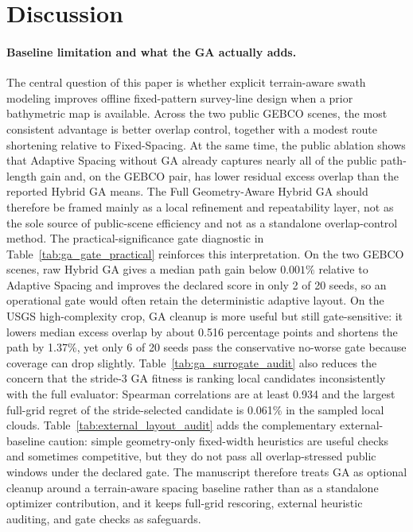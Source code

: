 \documentclass[jmse,article,submit,moreauthors]{Definitions/mdpi}
\begin{document}
\section{Discussion}
\label{sec:discussion}
\paragraph{Baseline limitation and what the GA actually adds.}
The central question of this paper is whether explicit terrain-aware swath modeling improves offline fixed-pattern survey-line design when a prior bathymetric map is available. Across the two public GEBCO scenes, the most consistent advantage is better overlap control, together with a modest route shortening relative to Fixed-Spacing. At the same time, the public ablation shows that Adaptive Spacing without GA already captures nearly all of the public path-length gain and, on the GEBCO pair, has lower residual excess overlap than the reported Hybrid GA means. The Full Geometry-Aware Hybrid GA should therefore be framed mainly as a local refinement and repeatability layer, not as the sole source of public-scene efficiency and not as a standalone overlap-control method.
The practical-significance gate diagnostic in Table~\ref{tab:ga_gate_practical} reinforces this interpretation. On the two GEBCO scenes, raw Hybrid GA gives a median path gain below \(0.001\%\) relative to Adaptive Spacing and improves the declared score in only 2 of 20 seeds, so an operational gate would often retain the deterministic adaptive layout. On the USGS high-complexity crop, GA cleanup is more useful but still gate-sensitive: it lowers median excess overlap by about 0.516 percentage points and shortens the path by 1.37\%, yet only 6 of 20 seeds pass the conservative no-worse gate because coverage can drop slightly. Table~\ref{tab:ga_surrogate_audit} also reduces the concern that the stride-3 GA fitness is ranking local candidates inconsistently with the full evaluator: Spearman correlations are at least 0.934 and the largest full-grid regret of the stride-selected candidate is 0.061\% in the sampled local clouds. Table~\ref{tab:external_layout_audit} adds the complementary external-baseline caution: simple geometry-only fixed-width heuristics are useful checks and sometimes competitive, but they do not pass all overlap-stressed public windows under the declared gate. The manuscript therefore treats GA as optional cleanup around a terrain-aware spacing baseline rather than as a standalone optimizer contribution, and it keeps full-grid rescoring, external heuristic auditing, and gate checks as safeguards.
\end{document}
